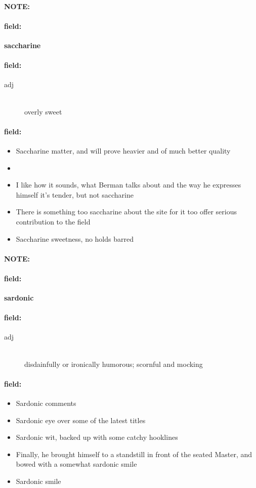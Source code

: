 \documentclass[12pt]{article}
\newenvironment{note}{\paragraph{NOTE:}}{}
\newenvironment{field}{\paragraph{field:}}{}
\begin{document}
\begin{note}
\begin{field}
\textbf{\large saccharine}
\end{field}


\begin{field}
\begin{description}
\item[adj] \hfill \\ 
overly sweet

\end{description}
\end{field}

\begin{field}
\begin{itemize}
\item Saccharine matter, and will prove heavier and of much better quality
\item 
\item I like how it sounds, what Berman talks about and the way he expresses himself  it's tender, but not saccharine
\item There is something too saccharine about the site for it too offer serious contribution to the field
\item Saccharine sweetness, no holds barred
\end{itemize}
\end{field}
\end{note}
\begin{note}
\begin{field}
\textbf{\large sardonic}
\end{field}


\begin{field}
\begin{description}
\item[adj] \hfill \\ 
disdainfully or ironically humorous; scornful and mocking

\end{description}
\end{field}

\begin{field}
\begin{itemize}
\item Sardonic comments
\item Sardonic eye over some of the latest titles
\item Sardonic wit, backed up with some catchy hooklines
\item Finally, he brought himself to a standstill in front of the seated Master, and bowed with a somewhat sardonic smile
\item Sardonic smile
\end{itemize}
\end{field}
\end{note}
\end{document}
